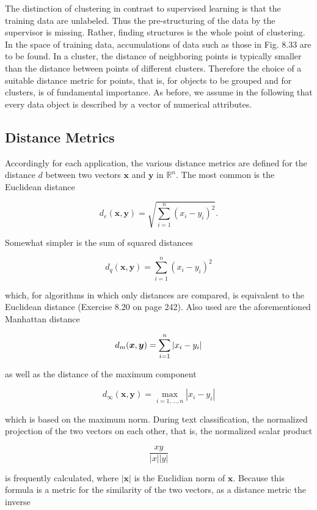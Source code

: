 \documentclass[10pt]{book}
\begin{document}
The distinction of clustering in contrast to supervised learning is that the training data are unlabeled. Thus the pre-structuring of the data by the supervisor is missing. Rather, finding structures is the whole point of clustering. In the space of training data, accumulations of data such as those in Fig. 8.33 are to be found. In a cluster, the distance of neighboring points is typically smaller than the distance between points of different clusters. Therefore the choice of a suitable distance metric for points, that is, for objects to be grouped and for clusters, is of fundamental importance. As before, we assume in the following that every data object is described by a vector of numerical attributes.

\subsection{Distance Metrics}
Accordingly for each application, the various distance metrics are defined for the distance $d$ between two vectors $\boldsymbol{x}$ and $\boldsymbol{y}$ in $\mathbb{R}^{n}$. The most common is the Euclidean distance

$$
d_{e}(\boldsymbol{x}, \boldsymbol{y})=\sqrt{\sum_{i=1}^{n}\left(x_{i}-y_{i}\right)^{2}} .
$$

Somewhat simpler is the sum of squared distances

$$
d_{q}(\boldsymbol{x}, \boldsymbol{y})=\sum_{i=1}^{n}\left(x_{i}-y_{i}\right)^{2}
$$

which, for algorithms in which only distances are compared, is equivalent to the Euclidean distance (Exercise 8.20 on page 242). Also used are the aforementioned Manhattan distance

$$\index{Silhouette width criterion}
d_{m}(\boldsymbol{x}, \boldsymbol{y})=\sum_{i=1}^{n}\left|x_{i}-y_{i}\right|
$$

as well as the distance of the maximum component

$$
d_{\infty}(\boldsymbol{x}, \boldsymbol{y})=\max _{i=1, \ldots, n}\left|x_{i}-y_{i}\right|
$$

which is based on the maximum norm. During text classification, the normalized projection of the two vectors on each other, that is, the normalized scalar product

$$
\frac{x y}{|x||y|}
$$

is frequently calculated, where $|\boldsymbol{x}|$ is the Euclidian norm of $\boldsymbol{x}$. Because this formula is a metric for the similarity of the two vectors, as a distance metric the inverse
\end{document}
